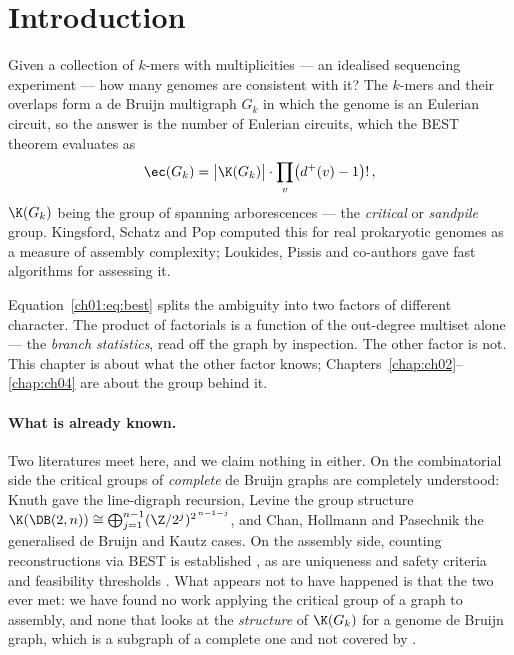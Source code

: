 \section{Introduction}\label{ch01:sec:intro}

Given a collection of $k$-mers with multiplicities --- an idealised sequencing experiment
--- how many genomes are consistent with it? The $k$-mers and their overlaps form a de
Bruijn multigraph $G_k$ in which the genome is an Eulerian circuit, so the answer is the
number of Eulerian circuits, which the BEST theorem \cite{BEST,SmithTutte} evaluates as
\begin{equation}\label{ch01:eq:best}
\ec(G_k)=\bigl|\K(G_k)\bigr|\cdot\prod_{v}\bigl(d^{+}(v)-1\bigr)!\,,
\end{equation}
$\K(G_k)$ being the group of spanning arborescences --- the \emph{critical} or
\emph{sandpile} group. Kingsford, Schatz and Pop \cite{KSP} computed this for real
prokaryotic genomes as a measure of assembly complexity; Loukides, Pissis and co-authors
\cite{Loukides} gave fast algorithms for assessing it.

Equation~\eqref{ch01:eq:best} splits the ambiguity into two factors of different character. The
product of factorials is a function of the out-degree multiset alone --- the \emph{branch
statistics}, read off the graph by inspection. The other factor is not. This chapter is
about what the other factor knows; Chapters~\ref{chap:ch02}--\ref{chap:ch04} are about the group
behind it.

\paragraph{What is already known.}
Two literatures meet here, and we claim nothing in either. On the combinatorial side the
critical groups of \emph{complete} de Bruijn graphs are completely understood: Knuth
\cite{Knuth} gave the line-digraph recursion, Levine \cite{Levine} the group structure
$\K(\DB(2,n))\cong\bigoplus_{j=1}^{n-1}(\Z/2^{j})^{2^{\,n-1-j}}$, and Chan, Hollmann and
Pasechnik \cite{CHP} the generalised de Bruijn and Kautz cases. On the assembly side,
counting reconstructions via BEST is established \cite{KSP,Loukides}, as are uniqueness and
safety criteria \cite{ObscuraTomescu} and feasibility thresholds \cite{BBT,NagarajanPop}.
What appears not to have happened is that the two ever met: we have found no work applying
the critical group of a graph to assembly, and none that looks at the \emph{structure} of
$\K(G_k)$ for a genome de Bruijn graph, which is a subgraph of a complete one and not
covered by \cite{Levine,CHP}.

